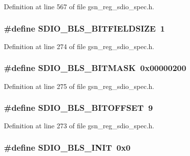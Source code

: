 Definition at line 567 of file gsn\_\-reg\_\-sdio\_\-spec.h.

\hypertarget{a00571_ab5a027b9fb7cf7e144b9624f0b39a8da}{
\subsubsection[{SDIO\_\-BLS\_\-BITFIELDSIZE}]{\setlength{\rightskip}{0pt plus 5cm}\#define SDIO\_\-BLS\_\-BITFIELDSIZE~1}}
\label{a00571_ab5a027b9fb7cf7e144b9624f0b39a8da}


Definition at line 274 of file gsn\_\-reg\_\-sdio\_\-spec.h.

\hypertarget{a00571_af4131734997d08ece58efe4bf6e978d1}{
\subsubsection[{SDIO\_\-BLS\_\-BITMASK}]{\setlength{\rightskip}{0pt plus 5cm}\#define SDIO\_\-BLS\_\-BITMASK~0x00000200}}
\label{a00571_af4131734997d08ece58efe4bf6e978d1}


Definition at line 275 of file gsn\_\-reg\_\-sdio\_\-spec.h.

\hypertarget{a00571_a3fd88a62f2240b4af92c16e06f47dfb7}{
\subsubsection[{SDIO\_\-BLS\_\-BITOFFSET}]{\setlength{\rightskip}{0pt plus 5cm}\#define SDIO\_\-BLS\_\-BITOFFSET~9}}
\label{a00571_a3fd88a62f2240b4af92c16e06f47dfb7}


Definition at line 273 of file gsn\_\-reg\_\-sdio\_\-spec.h.

\hypertarget{a00571_a561d8fe61d85d91a41e7765dbbc716b8}{
\subsubsection[{SDIO\_\-BLS\_\-INIT}]{\setlength{\rightskip}{0pt plus 5cm}\#define SDIO\_\-BLS\_\-INIT~0x0}}
\label{a00571_a561d8fe61d85d91a41e7765dbbc716b8}


